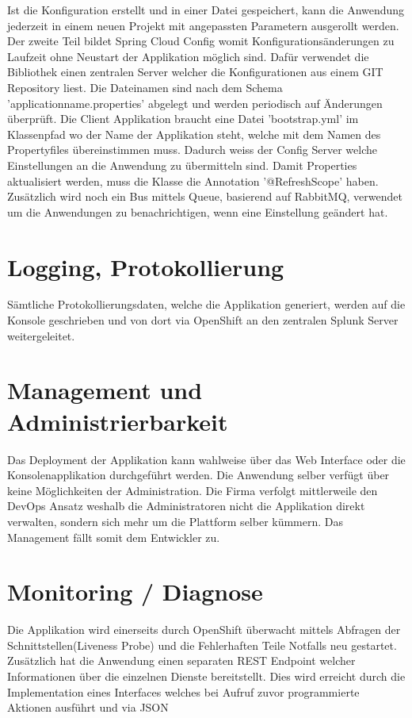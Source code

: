 Ist die Konfiguration erstellt und in einer Datei gespeichert, kann die Anwendung jederzeit in einem neuen Projekt mit angepassten Parametern ausgerollt werden.\newline
Der zweite Teil bildet Spring Cloud Config womit Konfigurationsänderungen zu Laufzeit ohne Neustart der Applikation möglich sind. Dafür verwendet die Bibliothek einen zentralen Server welcher die Konfigurationen aus einem GIT Repository liest. Die Dateinamen sind nach dem Schema 'applicationname.properties' abgelegt und werden periodisch auf Änderungen überprüft. Die Client Applikation braucht eine Datei 'bootstrap.yml' im Klassenpfad wo der Name der Applikation steht, welche mit dem Namen des Propertyfiles übereinstimmen muss. Dadurch weiss der Config Server welche Einstellungen an die Anwendung zu übermitteln sind. Damit Properties aktualisiert werden, muss die Klasse die Annotation '@RefreshScope' haben. Zusätzlich wird noch ein Bus mittels Queue, basierend auf RabbitMQ, verwendet um die Anwendungen zu benachrichtigen, wenn eine Einstellung geändert hat.

\section{Logging, Protokollierung}

Sämtliche Protokollierungsdaten, welche die Applikation generiert, werden auf die Konsole geschrieben und von dort via OpenShift an den zentralen Splunk Server weitergeleitet.

\section{Management und Administrierbarkeit}

Das Deployment der Applikation kann wahlweise über das Web Interface oder die Konsolenapplikation durchgeführt werden. Die Anwendung selber verfügt über keine Möglichkeiten der Administration. Die Firma verfolgt mittlerweile den DevOps Ansatz weshalb die Administratoren nicht die Applikation direkt verwalten, sondern sich mehr um die Plattform selber kümmern.  Das Management fällt somit dem Entwickler zu. 

\section{Monitoring / Diagnose}

Die Applikation wird einerseits durch OpenShift überwacht mittels Abfragen der Schnittstellen(Liveness Probe) und die Fehlerhaften Teile Notfalls neu gestartet. Zusätzlich hat die Anwendung einen separaten REST Endpoint welcher Informationen über die einzelnen Dienste bereitstellt. Dies wird erreicht durch die Implementation eines Interfaces welches bei Aufruf zuvor programmierte Aktionen ausführt und via JSON 

